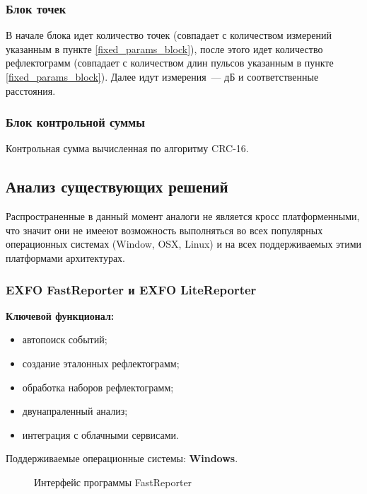 \subsubsection{Блок точек}

В начале блока идет количество точек (совпадает с количеством измерений указанным в пункте \ref{fixed_params_block}), после этого идет количество рефлектограмм (совпадает с количеством длин пульсов указанным в пункте \ref{fixed_params_block}). Далее идут измерения~--- дБ и соответственные расстояния.

\subsubsection{Блок контрольной суммы}

Контрольная сумма вычисленная по алгоритму CRC-16.

\subsection{Анализ существующих решений}

Распространенные в данный момент аналоги не является кросс платформенными, что значит они не имееют возможность выполняться во всех популярных операционных системах (Window, OSX, Linux) и на всех поддерживаемых этими платформами архитектурах.

\subsubsection{EXFO FastReporter и EXFO LiteReporter}

\textbf{Ключевой функционал:} \cite{web:fastreporter_specs}
\begin{itemize}
  \item автопоиск событий;
  \item создание эталонных рефлектограмм;
  \item обработка наборов рефлектограмм;
  \item двунапраленный анализ;
  \item интеграция с облачными сервисами.
\end{itemize}

Поддерживаемые операционные системы: \textbf{Windows}.

\begin{figure}[H]
  \caption{Интерфейс программы FastReporter}
  \label{ris:fastreporter}
\end{figure}

